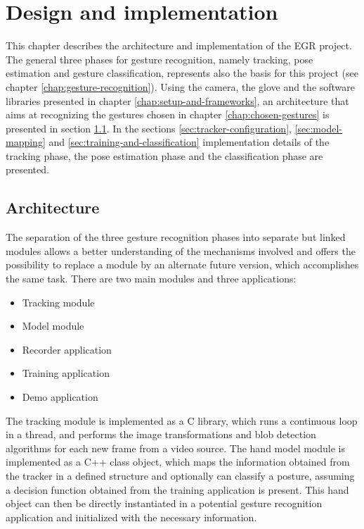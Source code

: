 \chapter{Design and implementation}
\label{chap:design-and-implementation}

This chapter describes the architecture and implementation of the EGR project. The general three phases for gesture recognition, namely tracking, pose estimation and gesture classification, represents also the basis for this project (see chapter \ref{chap:gesture-recognition}). Using the camera, the glove and the software libraries presented in chapter \ref{chap:setup-and-frameworks}, an architecture that aims at recognizing the gestures chosen in chapter \ref{chap:chosen-gestures} is presented in section \ref{sec:architecture}. In the sections \ref{sec:tracker-configuration}, \ref{sec:model-mapping} and \ref{sec:training-and-classification} implementation details of the tracking phase, the pose estimation phase and the classification phase are presented.

\section{Architecture}
\label{sec:architecture}

The separation of the three gesture recognition phases into separate but linked modules allows a better understanding of the mechanisms involved and offers the possibility to replace a module by an alternate future version, which accomplishes the same task. 
There are two main modules and three applications: 
\begin{itemize}
	\item Tracking module
	\item Model module
	\item Recorder application
	\item Training application
	\item Demo application
\end{itemize}

The tracking module is implemented as a C library, which runs a continuous loop in a thread, and performs the image transformations and blob detection algorithms for each new frame from a video source. The hand model module is implemented as a C++ class object, which maps the information obtained from the tracker in a defined structure and optionally can classify a posture, assuming a decision function obtained from the training application is present. This hand object can then be directly instantiated in a potential gesture recognition application and initialized with the necessary information.


